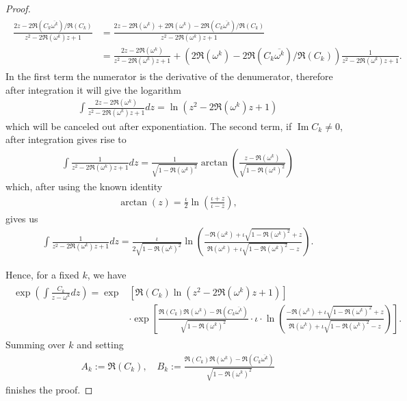\documentclass[oneside]{amsart}
\def\Im{\operatorname{Im}}
\begin{document}
\begin{proof}
\begin{align*}
\begin{split}
    \frac{2z - 2\Re(C_k\overline{\omega^k})/\Re(C_k)}{z^2 - 2\Re(\omega^k)z +1} &=
      \frac{2z -2\Re(\omega^k) +2\Re(\omega^k) -2\Re(C_k\overline{\omega^k})/\Re(C_k)}{z^2 - 2\Re(\omega^k)z +1} \\
    &= \frac{2z -2\Re(\omega^k)}{z^2 - 2\Re(\omega^k)z +1}
      + \left( 2\Re(\omega^k) -2\Re(C_k\overline{\omega^k})/\Re(C_k) \right)\frac{1}{z^2 - 2\Re(\omega^k)z +1}.
  \end{split}
  \end{align*}
  In the first term the numerator is the derivative of the denumerator, therefore after integration
  it will give the logarithm
  \begin{align*}
    \int \frac{2z -2\Re(\omega^k)}{z^2 - 2\Re(\omega^k)z +1} dz = \ln \left( z^2 - 2\Re(\omega^k)z +1 \right)
  \end{align*}
  which will be canceled out after exponentiation.
  The second term, if $\Im C_k \neq 0$, after integration gives rise to
  \begin{align*}
    \int \frac{1}{z^2-2\Re(\omega^k)z+1} dz =
      \frac{1}{\sqrt{1-\Re(\omega^k)^2}} \arctan \left( \frac{z-\Re(\omega^k)}{\sqrt{1-\Re(\omega^k)^2}} \right)
  \end{align*}
  which, after using the known identity
  \begin{align*}
    \arctan(z) = \frac{\iota}{2} \ln \left(\frac{\iota + z}{\iota - z} \right),
  \end{align*}
  gives us
  \begin{align*}
    \int \frac{1}{z^2-2\Re(\omega^k)z+1} dz =
      \frac{\iota}{2\sqrt{1-\Re(\omega^k)^2}} \ln \left( \frac{-\Re(\omega^k) + \iota\sqrt{1-\Re(\omega^k)^2} + z}{\Re(\omega^k) + \iota\sqrt{1-\Re(\omega^k)^2} - z} \right).
  \end{align*}

  Hence, for a fixed $k$, we have
  \begin{align*}
  \begin{split}
    \exp \left( \int \frac{C_k}{z-\omega^k} dz \right)
      = \exp &\left[ \Re(C_k) \ln \left( z^2 - 2\Re(\omega^k)z +1 \right) \right] \\
    &\cdot \exp \left[ \frac{\Re(C_k)\Re(\omega^k) - \Re(C_k\overline{\omega^k})}{\sqrt{1-\Re(\omega^k)^2}} \cdot \iota \cdot \ln \left( \frac{-\Re(\omega^k) + \iota\sqrt{1-\Re(\omega^k)^2} + z}{\Re(\omega^k) + \iota\sqrt{1-\Re(\omega^k)^2} - z} \right) \right].
  \end{split}
  \end{align*}
  Summing over $k$ and setting
  \begin{align*}
    A_k := \Re(C_k), \quad B_k := \frac{\Re(C_k)\Re(\omega^k) - \Re(C_k\overline{\omega^k})}{\sqrt{1-\Re(\omega^k)^2}}
  \end{align*}
  finishes the proof.
\end{proof}
\end{document}
